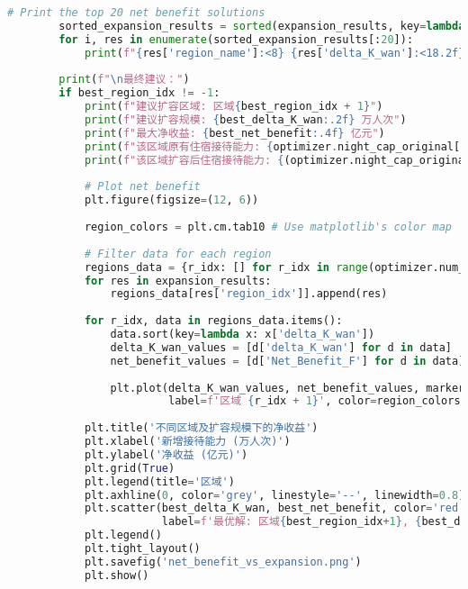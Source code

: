 \begin{lstlisting}[language=Python]
        # Print the top 20 net benefit solutions
        sorted_expansion_results = sorted(expansion_results, key=lambda x: x['Net_Benefit_F'], reverse=True)
        for i, res in enumerate(sorted_expansion_results[:20]):
            print(f"{res['region_name']:<8} {res['delta_K_wan']:<18.2f} {res['original_night_cap_wan']:<16.2f} {res['new_night_cap_wan']:<16.2f} {res['Net_Benefit_F']:<12.4f}")
    
        print(f"\n最终建议：")
        if best_region_idx != -1:
            print(f"建议扩容区域: 区域{best_region_idx + 1}")
            print(f"建议扩容规模: {best_delta_K_wan:.2f} 万人次")
            print(f"最大净收益: {best_net_benefit:.4f} 亿元")
            print(f"该区域原有住宿接待能力: {optimizer.night_cap_original[best_region_idx]/10000:.2f} 万人次")
            print(f"该区域扩容后住宿接待能力: {(optimizer.night_cap_original[best_region_idx] + best_delta_K_wan * 10000)/10000:.2f} 万人次")
    
            # Plot net benefit
            plt.figure(figsize=(12, 6))
            
            region_colors = plt.cm.tab10 # Use matplotlib's color map
            
            # Filter data for each region
            regions_data = {r_idx: [] for r_idx in range(optimizer.num_regions)}
            for res in expansion_results:
                regions_data[res['region_idx']].append(res)
            
            for r_idx, data in regions_data.items():
                data.sort(key=lambda x: x['delta_K_wan'])
                delta_K_wan_values = [d['delta_K_wan'] for d in data]
                net_benefit_values = [d['Net_Benefit_F'] for d in data]
                
                plt.plot(delta_K_wan_values, net_benefit_values, marker='o', linestyle='-',
                         label=f'区域 {r_idx + 1}', color=region_colors(r_idx))
            
            plt.title('不同区域及扩容规模下的净收益')
            plt.xlabel('新增接待能力 (万人次)')
            plt.ylabel('净收益 (亿元)')
            plt.grid(True)
            plt.legend(title='区域')
            plt.axhline(0, color='grey', linestyle='--', linewidth=0.8) # Zero benefit line
            plt.scatter(best_delta_K_wan, best_net_benefit, color='red', marker='X', s=200, 
                        label=f'最优解: 区域{best_region_idx+1}, {best_delta_K_wan:.2f}万人次, {best_net_benefit:.4f}亿元')
            plt.legend()
            plt.tight_layout()
            plt.savefig('net_benefit_vs_expansion.png')
            plt.show()
    

\end{lstlisting}
